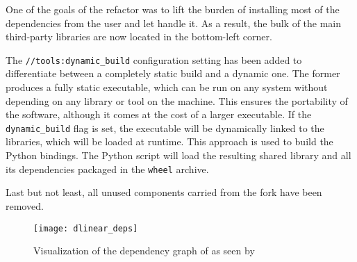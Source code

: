 One of the goals of the refactor was to lift the burden of installing most of the dependencies from the user and let \bazel handle it.
As a result, the bulk of the main third-party libraries are now located in the bottom-left corner.

The \texttt{//tools:dynamic_build} configuration setting has been added to differentiate between a completely static build and a dynamic one.
The former produces a fully static executable, which can be run on any system without depending on any library or tool on the machine.
This ensures the portability of the software, although it comes at the cost of a larger executable.
If the \texttt{dynamic\_build} flag is set, the executable will be dynamically linked to the libraries, which will be loaded at runtime.
This approach is used to build the Python bindings.
The Python script will load the resulting shared library and all its dependencies packaged in the \texttt{wheel} archive.

Last but not least, all unused components carried from the \dreal fork have been removed.

\begin{figure}[h]
    \centering
    \texttt{[image: dlinear\_deps]}
    \caption{Visualization of the dependency graph of \dlinear as seen by \bazel}\label{fig:dlinear-deps}
\end{figure}
